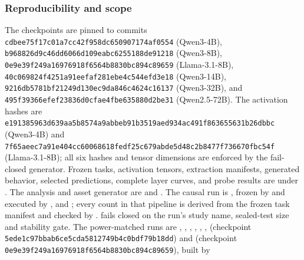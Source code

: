 \subsubsection{Reproducibility and scope}
The checkpoints are pinned to commits
\texttt{cdbee75f17c01a7cc42f958dc650907174af0554} (Qwen3-4B),
\texttt{b968826d9c46dd6066d109eabc6255188de91218} (Qwen3-8B),
\texttt{0e9e39f249a16976918f6564b8830bc894c89659} (Llama-3.1-8B),
\texttt{40c069824f4251a91eefaf281ebe4c544efd3e18} (Qwen3-14B),
\texttt{9216db5781bf21249d130ec9da846c4624c16137} (Qwen3-32B), and
\texttt{495f39366efef23836d0cfae4fbe635880d2be31} (Qwen2.5-72B).
The activation hashes are
\texttt{e1913859\allowbreak{}63d639aa\allowbreak{}5b8574a9\allowbreak{}abbeb91b\allowbreak{}3519aed9\allowbreak{}34ac491f\allowbreak{}86365563\allowbreak{}1b26dbbc}
(Qwen3-4B) and
\texttt{7f65aeec\allowbreak{}7a91e404\allowbreak{}cc600686\allowbreak{}18fedf25\allowbreak{}c679abde\allowbreak{}5d48c2b8\allowbreak{}477f7366\allowbreak{}70fbc54f}
(Llama-3.1-8B); all six hashes and tensor dimensions are enforced by the
fail-closed generator. Frozen tasks, activation tensors, extraction manifests,
generated behavior, selected predictions, complete layer curves, and probe
results are under
.
The analysis and asset generator are
 and
. The causal run is
, frozen by
 and executed by
, 
and ; every count in that pipeline is
derived from the frozen task manifest and checked by
.
 fails closed on the run's
study name, sealed-test size and stability gate. The power-matched runs are
,
,
,
,
,
,
 (checkpoint
\texttt{5ede1c97bbab6ce5cda5812749b4c0bdf79b18dd}) and
 (checkpoint
\texttt{0e9e39f249a16976918f6564b8830bc894c89659}), built by
